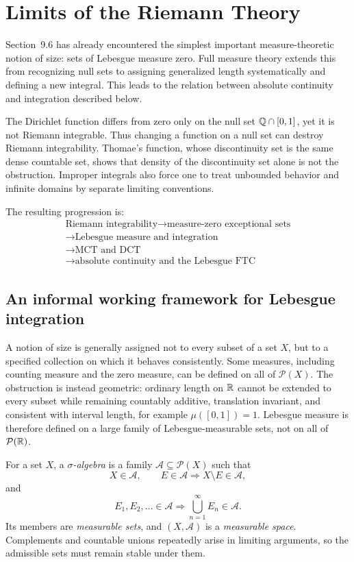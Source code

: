 \section{Limits of the Riemann Theory}

Section~9.6 has already encountered the simplest important
measure-theoretic notion of size: sets of Lebesgue measure zero. Full
measure theory extends this from recognizing null sets to assigning
generalized length systematically and defining a new integral. This leads
to the relation between absolute continuity and integration described below.

The Dirichlet function differs from zero only on the null set
$\mathbb{Q}\cap[0,1]$, yet it is not Riemann integrable. Thus changing a function
on a null set can destroy Riemann integrability. Thomae's function,
whose discontinuity set is the same dense countable set, shows that density
of the discontinuity set alone is not the obstruction. Improper integrals also force one to treat unbounded
behavior and infinite domains by separate limiting conventions.

The resulting progression is:
\[
\boxed{
\begin{gathered}
\text{Riemann integrability}\longrightarrow\text{measure-zero exceptional sets}\\
\longrightarrow\text{Lebesgue measure and integration}\\
\longrightarrow\text{MCT and DCT}\\
\longrightarrow\text{absolute continuity and the Lebesgue FTC}
\end{gathered}}
\]

\subsection*{An informal working framework for Lebesgue integration}
A notion of size is generally assigned not to every subset of a set $X$,
but to a specified collection on which it behaves consistently. Some
measures, including counting measure and the zero measure, can be defined on
all of $\mathcal P(X)$. The obstruction is instead geometric: ordinary
length on $\mathbb{R}$ cannot be extended to every subset while remaining countably
additive, translation invariant, and consistent with interval length, for
example $\mu([0,1])=1$. Lebesgue measure is therefore defined on a large
family of Lebesgue-measurable sets, not on all of $\mathcal P(\mathbb{R})$.

\begin{definition}
For a set $X$, a \emph{$\sigma$-algebra} is a family
$\mathcal A\subseteq\mathcal P(X)$ such that
\[
X\in\mathcal A,
\qquad E\in\mathcal A\Longrightarrow X\setminus E\in\mathcal A,
\]
and
\[
E_1,E_2,\ldots\in\mathcal A
\Longrightarrow \bigcup_{n=1}^\infty E_n\in\mathcal A.
\]
Its members are \emph{measurable sets}, and $(X,\mathcal A)$ is a
\emph{measurable space}. Complements and countable unions repeatedly arise
in limiting arguments, so the admissible sets must remain stable under them.
\end{definition}

